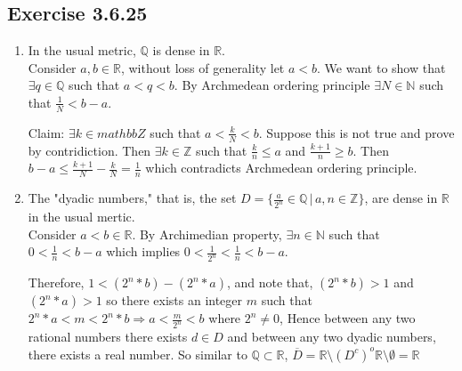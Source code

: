 \documentclass{tufte-book}
\theoremstyle{mytheoremstyle}
\theoremstyle{mylemstyle}
\theoremstyle{mydefstyle}
\begin{document}
\subsection{Exercise 3.6.25}
\begin{enumerate}
\item In the usual metric, $\mathbb{Q}$ is dense in $\mathbb{R}$.\\
Consider $a,b \in \mathbb{R}$, without loss of generality let $a<b$.  We want to show that $\exists q \in \mathbb{Q}$ such that $a < q < b$.  By Archmedean ordering principle $\exists N \in \mathbb{N}$ such that $\frac{1}{N} < b-a$.

Claim: $\exists k \in mathbb{Z}$ such that $a < \frac{k}{N} < b$.
Suppose this is not true and prove by contridiction.  Then $\exists k \in \mathbb{Z}$ such that $\frac{k}{n} \leq a$ and $\frac{k+1}{n} \geq b$.  Then $b-a \leq \frac{k+1}{N} - \frac{k}{N} = \frac{1}{n}$ which contradicts Archmedean ordering principle.

\item The "dyadic numbers," that is, the set $D = \{ \frac{a}{2^n} \in \mathbb{Q} \,|\, a,n \in \mathbb{Z}\}$, are dense in $\mathbb{R}$ in the usual mertic.\\
Consider $a < b \in \mathbb{R}$.  By Archimedian property, $\exists n \in \mathbb{N}$ such that $0 < \frac{1}{n} < b-a$ which implies $0 < \frac{1}{2^n} < \frac{1}{n} < b-a$.

Therefore, $1<(2^n *b)-(2^n*a)$, and note that, $(2^n *b) >1$ and $(2^n *a)>1$ so there exists an integer $m$ such that $2^n *a<m<2^n*b \Rightarrow a< \frac{m}{2^n} < b$ where $2^n \neq 0$,  Hence between any two rational numbers there exists $d \in D$ and between any two dyadic numbers, there exists a real number.  So similar to $\mathbb{Q} \subset \mathbb{R}$, $\overline{D} = \mathbb{R}\setminus(D^c)^o\mathbb{R} \setminus \emptyset = \mathbb{R}$

\end{enumerate}
\end{document}
